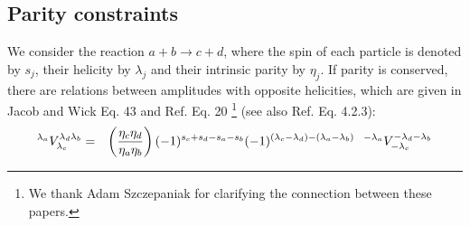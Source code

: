 \subsection{Parity constraints  \label{sec:parity}}
We consider the reaction $a + b \rightarrow c + d$, where the spin of each particle is denoted by $s_j$, their helicity by $\lambda_j$ and their intrinsic parity by $\eta_j$. 
If parity is conserved, there are relations between amplitudes with opposite helicities, which are  given in Jacob and Wick \cite{Jacob:1959at} Eq. 43 and  Ref.\cite{Schilling:1969um}  Eq. 20 \footnote{We thank Adam
Szczepaniak for clarifying the connection between these papers.} (see also Ref. \cite{leader} Eq. 4.2.3):
\begin{eqnarray}
^{\lambda_a}V_{\lambda_c}^{\lambda_{d}\lambda_{b}}  & = & \left( \eta_c \eta_d \over \eta_a \eta_b \right) (-1)^{s_c+s_d-s_a-s_b} (-1)^{(\lambda_c-\lambda_d)-(\lambda_a-\lambda_b)}  \hspace{0.25cm} ^{-\lambda_a}V_{-\lambda_c}^{-\lambda_{d}-\lambda_{b}}   \label{eq:parity}
\end{eqnarray}

